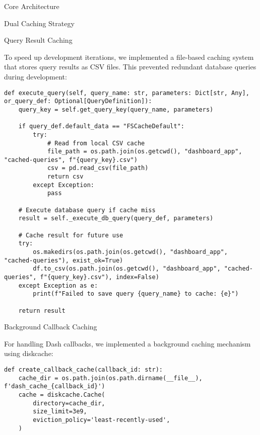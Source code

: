 \begin{section}{Core Architecture}
\begin{subsection}{Dual Caching Strategy}
		\begin{subsubsection}{Query Result Caching}
			\label{subsubsec:implementation-core-architecture-query-cache}

			To speed up development iterations, we implemented a file-based caching system that stores query results as CSV files. This prevented redundant database queries during development:

			\begin{listing}[H]
				\caption{Query Result Caching Implementation}
				\begin{verbatim}
def execute_query(self, query_name: str, parameters: Dict[str, Any], or_query_def: Optional[QueryDefinition]):
    query_key = self.get_query_key(query_name, parameters)

    if query_def.default_data == "FSCacheDefault":
        try:
            # Read from local CSV cache
            file_path = os.path.join(os.getcwd(), "dashboard_app", "cached-queries", f"{query_key}.csv")
            csv = pd.read_csv(file_path)
            return csv
        except Exception:
            pass

    # Execute database query if cache miss
    result = self._execute_db_query(query_def, parameters)

    # Cache result for future use
    try:
        os.makedirs(os.path.join(os.getcwd(), "dashboard_app", "cached-queries"), exist_ok=True)
        df.to_csv(os.path.join(os.getcwd(), "dashboard_app", "cached-queries", f"{query_key}.csv"), index=False)
    except Exception as e:
        print(f"Failed to save query {query_name} to cache: {e}")

    return result
				\end{verbatim}
				\label{listing:dashboard-implementation-query-cache}
			\end{listing}

		\end{subsubsection}

		\begin{subsubsection}{Background Callback Caching}
			\label{subsubsec:implementation-core-architecture-callback-cache}

			For handling Dash callbacks, we implemented a background caching mechanism using diskcache:

			\begin{listing}[H]
				\caption{Background Callback Cache Implementation}
				\begin{verbatim}
def create_callback_cache(callback_id: str):
    cache_dir = os.path.join(os.path.dirname(__file__), f'dash_cache_{callback_id}')
    cache = diskcache.Cache(
        directory=cache_dir,
        size_limit=3e9,
        eviction_policy='least-recently-used',
    )


\end{verbatim}
\end{listing}
\end{subsubsection}
\end{subsection}
\end{section}
